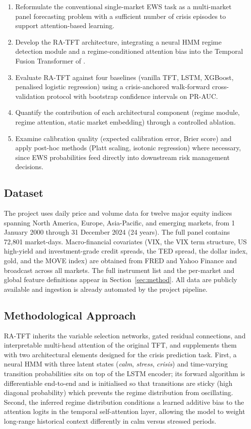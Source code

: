 \documentclass[11pt,a4paper]{article}
\begin{document}
\begin{enumerate}
\item Reformulate the conventional single-market EWS task as a multi-market
panel forecasting problem with a sufficient number of crisis episodes to
support attention-based learning.
\item Develop the RA-TFT architecture, integrating a neural HMM regime
detection module and a regime-conditioned attention bias into the Temporal
Fusion Transformer of \citet{lim2021tft}.
\item Evaluate RA-TFT against four baselines (vanilla TFT, LSTM, XGBoost,
penalised logistic regression) using a crisis-anchored walk-forward
cross-validation protocol with bootstrap confidence intervals on PR-AUC.
\item Quantify the contribution of each architectural component
(regime module, regime attention, static market embedding) through a
controlled ablation.
\item Examine calibration quality (expected calibration error, Brier score)
and apply post-hoc methods (Platt scaling, isotonic regression) where
necessary, since EWS probabilities feed directly into downstream risk
management decisions.
\end{enumerate}

\subsection{Dataset}
The project uses daily price and volume data for twelve major equity indices
spanning North America, Europe, Asia-Pacific, and emerging markets, from
1 January 2000 through 31 December 2024 (24 years). The full panel
contains 72{,}801 market-days. Macro-financial covariates (VIX, the
VIX term structure, US high-yield and investment-grade credit spreads, the
TED spread, the dollar index, gold, and the MOVE index) are obtained from
FRED and Yahoo Finance and broadcast across all markets. The full instrument
list and the per-market and global feature definitions appear in
Section~\ref{sec:method}. All data are publicly available and ingestion is
already automated by the project pipeline.

\subsection{Methodological Approach}
RA-TFT inherits the variable selection networks, gated residual connections,
and interpretable multi-head attention of the original TFT, and supplements
them with two architectural elements designed for the crisis prediction
task. First, a neural HMM with three latent states (\emph{calm},
\emph{stress}, \emph{crisis}) and time-varying transition probabilities sits
on top of the LSTM encoder; its forward algorithm is differentiable end-to-end
and is initialised so that transitions are sticky (high diagonal probability)
which prevents the regime distribution from oscillating. Second, the
inferred regime distribution conditions a learned additive bias to the
attention logits in the temporal self-attention layer, allowing the model to
weight long-range historical context differently in calm versus stressed
periods.
\end{document}
